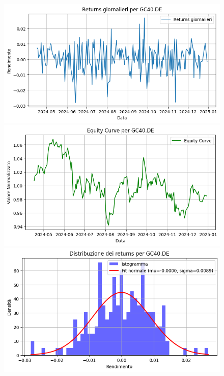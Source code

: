 \documentclass{article}%
\begin{document}
\begin{figure}[htbp]%
\begin{minipage}{0.31\textwidth}%
\includegraphics[width=\linewidth]{immagini_tickers/GC40.DE_returns_plot.png}%
\end{minipage}%
\begin{minipage}{0.31\textwidth}%
\includegraphics[width=\linewidth]{immagini_tickers/GC40.DE_equity_curve.png}%
\end{minipage}%
\begin{minipage}{0.31\textwidth}%
\includegraphics[width=\linewidth]{immagini_tickers/GC40.DE_distribuzione_returns.png}%
\end{minipage}%
\end{figure}
\end{document}
